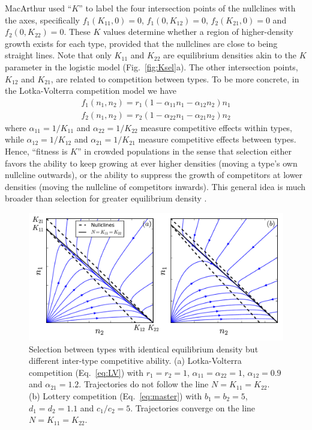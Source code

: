 \documentclass[12pt]{article}
\begin{document}
MacArthur used ``$K$'' to label the four intersection points of the nullclines with the axes, specifically $f_1(K_{11},0)=0$, $f_1(0,K_{12})=0$, $f_2(K_{21},0)=0$ and $f_2(0,K_{22})=0$. These $K$ values determine whether a region of higher-density growth exists for each type, provided that the nullclines are close to being straight lines. Note that only $K_{11}$ and $K_{22}$ are equilibrium densities akin to the $K$ parameter in the logistic model (Fig.~\ref{fig:Ksel}a). The other intersection points, $K_{12}$ and $K_{21}$, are related to competition between types. To be more concrete, in the Lotka-Volterra competition model we have
\begin{align}
f_1(n_1,n_2) = r_1(1-\alpha_{11}n_1-\alpha_{12}n_2)n_1\nonumber\\
f_2(n_1,n_2) = r_2(1-\alpha_{22}n_1-\alpha_{21}n_2)n_2\label{eq:LV}
\end{align}
where $\alpha_{11}=1/K_{11}$ and $\alpha_{22}=1/K_{22}$ measure competitive effects within types, while $\alpha_{12}=1/K_{12}$ and $\alpha_{21}=1/K_{21}$ measure competitive effects between types. Hence, ``fitness is $K$'' in crowded populations \citep[pp. 149]{macarthur_1967} in the sense that selection either favors the ability to keep growing at ever higher densities (moving a type's own nullcline outwards), or the ability to suppress the growth of competitors at lower densities (moving the nullcline of competitors inwards). This general idea is much broader than selection for greater equilibrium density \citep{gill_1974}.

\begin{figure}
\centering
\includegraphics[scale=0.8]{LVvslottery.pdf}
\caption{\label{fig:LVvslottery} Selection between types with identical equilibrium density but different inter-type competitive ability. (a) Lotka-Volterra competition (Eq.~\ref{eq:LV}) with $r_1=r_2=1$, $\alpha_{11}=\alpha_{22}=1$, $\alpha_{12}=0.9$ and $\alpha_{21}=1.2$. Trajectories do not follow the line $N=K_{11}=K_{22}$. (b) Lottery competition (Eq.~\ref{eq:master}) with $b_1=b_2=5$, $d_1=d_2=1.1$ and $c_1/c_2=5$. Trajectories converge on the line $N=K_{11}=K_{22}$.}
\end{figure}
\end{document}

